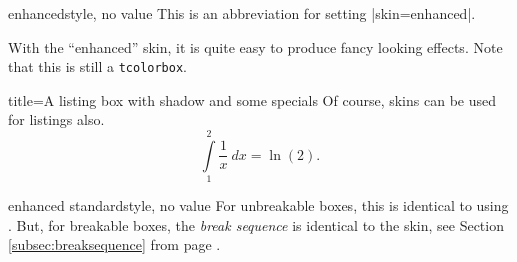 \begin{docTcbKey}{enhanced}{}{style, no value}
  This is an abbreviation for setting |skin=enhanced|.
\end{docTcbKey}

\begin{dispExample}
\end{dispExample}

\clearpage

\begin{dispExample}

\begin{tcolorbox}[title=Nice box in rainbow colors]
  With the \enquote{enhanced} skin, it is quite easy to produce fancy looking effects.
  \tcblower
  Note that this is still a \texttt{tcolorbox}.
\end{tcolorbox}
\end{dispExample}


\begin{dispExample}

\begin{tcblisting}{title=A listing box with shadow and some specials}
Of course, skins can be used for listings also.
\begin{equation}
  \int\limits_1^2 \frac{1}{x}~dx = \ln(2).
\end{equation}
\end{tcblisting}
\end{dispExample}


\clearpage


\begin{docTcbKey}{enhanced standard}{}{style, no value}
  For unbreakable boxes, this is identical to using .
  But, for breakable boxes, the \emph{break sequence} is identical to the  skin,
  see Section \ref{subsec:breaksequence} from page \pageref{subsec:breaksequence}.
\end{docTcbKey}


